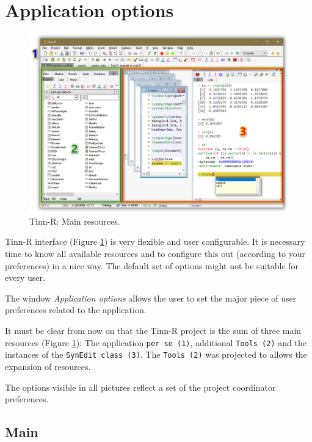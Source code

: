 
\hypertarget{working_app}{}
\section{Application options}

\begin{figure}[h!]
  \begin{center}
    \includegraphics[width=\headwidth]{./res/parts_01.png}
  \end{center}
  \caption{Tinn-R: Main resources.}
  \label{fig:tinn-r_interface}
\end{figure}

Tinn-R interface
(Figure \ref{fig:tinn-r_interface})
is very flexible and user configurable. It is necessary time
to know all available resources and to configure this out (according to your
preferences) in a nice way. The default set of options might not be suitable
for every user.

The window \textit{Application options} allows the user to set the major piece
of user preferences related to the application.

It must be clear from now on that the Tinn-R project is the sum of three main
resources (Figure \ref{fig:tinn-r_interface}):
The application \texttt{per se (1)},
additional \texttt{Tools (2)} and
the instances of the \texttt{SynEdit class (3)}.
The \texttt{Tools (2)} was projected to allows the expansion of resources.

The options visible in all pictures reflect a set of the project coordinator
preferences.


\hypertarget{working_app_main}{}
\subsection{Main}

